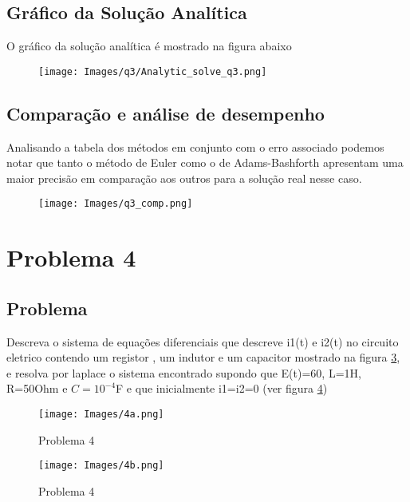 \documentclass[12pt]{article}
\begin{document}
\subsection{Gráfico da Solução Analítica}
O gráfico da solução analítica é mostrado na figura abaixo

\begin{figure}[H]
\centering
\texttt{[image: Images/q3/Analytic\_solve\_q3.png]}
\label{fig_q3_SA}
\end{figure}
\subsection{Comparação e análise de desempenho}
Analisando a tabela dos métodos em conjunto com o erro associado podemos notar que tanto o método de Euler como o de Adams-Bashforth apresentam uma maior precisão em comparação aos outros para a solução real nesse caso.
\begin{figure}[H]
\centering
\texttt{[image: Images/q3\_comp.png]}
\label{fig_q3_comp}
\end{figure}




\section{Problema 4}

\subsection{Problema}
Descreva o sistema de equações diferenciais que descreve i1(t) e i2(t) no circuito eletrico contendo um registor , um indutor e um capacitor mostrado na figura \ref{fig_4a}, e resolva por laplace o sistema encontrado supondo que E(t)=60, L=1H, R=50Ohm e $C=10^{-4}$F e que inicialmente i1=i2=0 (ver figura \ref{fig_4b})  
\begin{figure}[H]
\centering
\texttt{[image: Images/4a.png]}
\caption{Problema 4}
\label{fig_4a}
\end{figure}
\begin{figure}[H]
\centering
\texttt{[image: Images/4b.png]}
\caption{Problema 4}
\label{fig_4b}
\end{figure}
\end{document}
